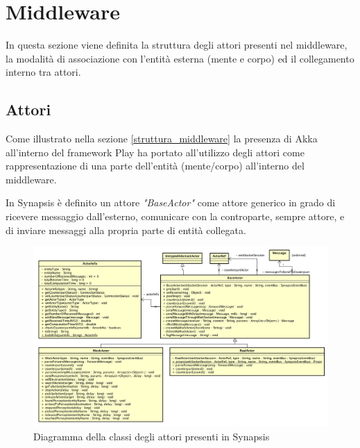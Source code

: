 \section{Middleware}

In questa sezione viene definita la struttura degli attori presenti nel middleware, la modalità di associazione con l'entità esterna (mente e corpo) ed il collegamento interno tra attori.

\subsection{Attori}

Come illustrato nella sezione \ref{struttura_middleware} la presenza di Akka all'interno del framework Play ha portato all'utilizzo degli attori come rappresentazione di una parte dell'entità (mente/corpo) all'interno del middleware. 

\medskip

In Synapsis è definito un attore \textit{"BaseActor"} come attore generico in grado di ricevere messaggio dall'esterno, comunicare con la controparte, sempre attore, e di inviare messaggi alla propria parte di entità collegata.

\begin{figure}[H]
\centering
\includegraphics[width=\textwidth]{figures/diagramma_classi_attori.png}
\caption{Diagramma della classi degli attori presenti in Synapsis}
\label{classi_attori}
\end{figure}

